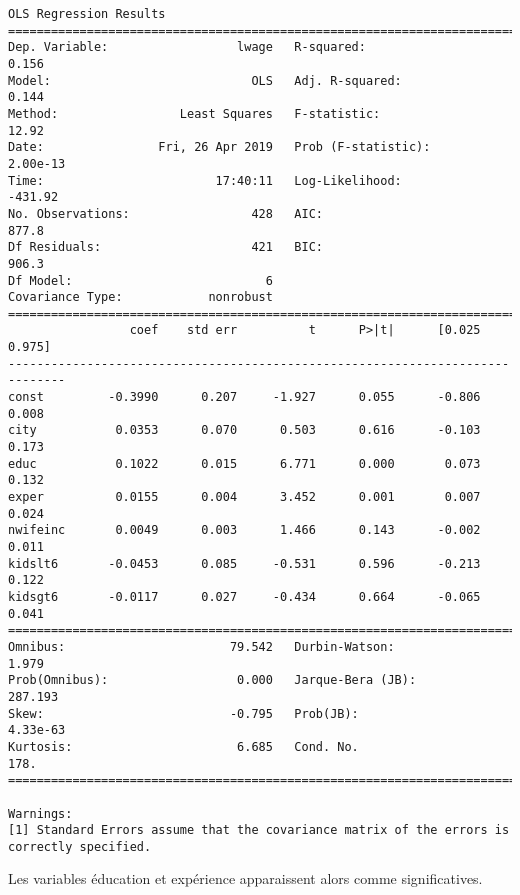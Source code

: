 \documentclass[11pt]{article}
\begin{document}
    \begin{Verbatim}[commandchars=\\\{\}]
                            OLS Regression Results                            
==============================================================================
Dep. Variable:                  lwage   R-squared:                       0.156
Model:                            OLS   Adj. R-squared:                  0.144
Method:                 Least Squares   F-statistic:                     12.92
Date:                Fri, 26 Apr 2019   Prob (F-statistic):           2.00e-13
Time:                        17:40:11   Log-Likelihood:                -431.92
No. Observations:                 428   AIC:                             877.8
Df Residuals:                     421   BIC:                             906.3
Df Model:                           6                                         
Covariance Type:            nonrobust                                         
==============================================================================
                 coef    std err          t      P>|t|      [0.025      0.975]
------------------------------------------------------------------------------
const         -0.3990      0.207     -1.927      0.055      -0.806       0.008
city           0.0353      0.070      0.503      0.616      -0.103       0.173
educ           0.1022      0.015      6.771      0.000       0.073       0.132
exper          0.0155      0.004      3.452      0.001       0.007       0.024
nwifeinc       0.0049      0.003      1.466      0.143      -0.002       0.011
kidslt6       -0.0453      0.085     -0.531      0.596      -0.213       0.122
kidsgt6       -0.0117      0.027     -0.434      0.664      -0.065       0.041
==============================================================================
Omnibus:                       79.542   Durbin-Watson:                   1.979
Prob(Omnibus):                  0.000   Jarque-Bera (JB):              287.193
Skew:                          -0.795   Prob(JB):                     4.33e-63
Kurtosis:                       6.685   Cond. No.                         178.
==============================================================================

Warnings:
[1] Standard Errors assume that the covariance matrix of the errors is correctly specified.

    \end{Verbatim}

    Les variables éducation et expérience apparaissent alors comme
significatives.
\end{document}
